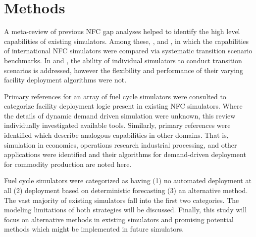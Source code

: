 \section{Methods}
A meta-review of previous \gls{NFC} gap analyses 
helped to identify the high level capabilities of existing simulators. Among 
these,
\cite{boucher_international_2010}, 
\cite{brown_identification_2016} and \cite{mccarthy_benchmark_2012}, in which 
the capabilities of international \gls{NFC} simulators were compared via 
systematic transition scenario benchmarks. 
In \cite{carre_overview_2009} and \cite{hoffman_expanded_2016}, the ability of individual 
simulators to conduct transition scenarios is addressed, however the 
flexibility and performance of their varying facility deployment algorithms 
were not.

Primary references for an array of fuel cycle simulators were consulted to 
categorize facility deployment logic present in existing \gls{NFC} simulators. 
Where the details of dynamic demand driven simulation were unknown, this review 
individually investigated available tools.  Similarly, primary references were 
identified which describe analogous capabilities in other domains. That is, 
simulation in economics, operations research industrial processing, and other 
applications were identified and their algorithms for demand-driven deployment 
for commodity production are noted here.

Fuel cycle simulators were categorized as having (1) no automated deployment at all (2) 
deployment based on deterministic forecasting (3) an alternative method. The 
vast majority of existing simulators fall into the first two categories. 
The modeling limitations of both strategies will be discussed. Finally, this 
study will focus on alternative methods in existing simulators and 
promising potential methods which might be implemented in future simulators.  
